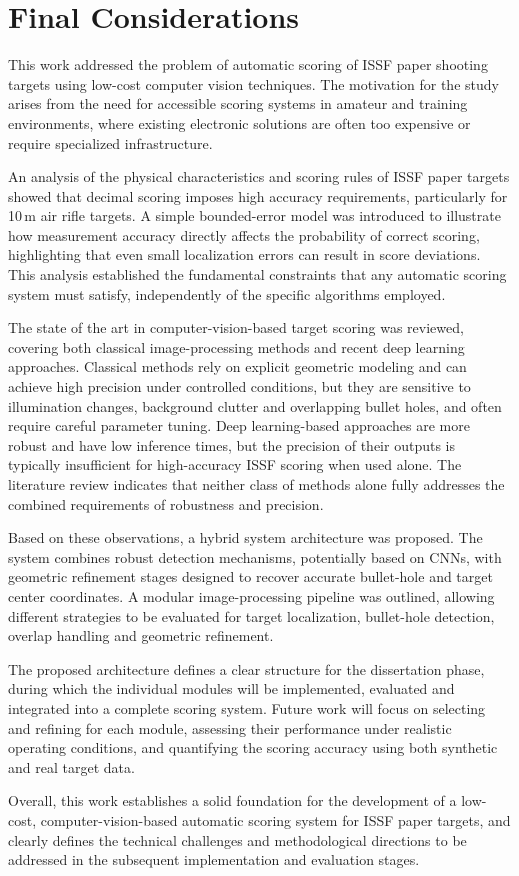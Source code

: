\chapter{Final Considerations}
\label{chap:final_considerations}

This work addressed the problem of automatic scoring of ISSF paper shooting targets
using low-cost computer vision techniques. The motivation for the study arises from the need for
accessible scoring systems in amateur and training environments, where existing electronic
solutions are often too expensive or require specialized infrastructure.

An analysis of the physical characteristics and scoring rules of ISSF paper targets showed that
decimal scoring imposes high accuracy requirements, particularly for 10\,m air rifle
targets. A simple bounded-error model was introduced to illustrate how measurement accuracy
directly affects the probability of correct scoring, highlighting that even small localization
errors can result in score deviations. This analysis established the fundamental constraints that
any automatic scoring system must satisfy, independently of the specific algorithms employed.

The state of the art in computer-vision-based target scoring was reviewed, covering both
classical image-processing methods and recent deep learning approaches. Classical methods
rely on explicit geometric modeling and can achieve high precision under controlled conditions,
but they are sensitive to illumination changes, background clutter and overlapping
bullet holes, and often require careful parameter tuning. Deep learning-based approaches are
more robust and have low inference times, but the precision of their outputs is 
typically insufficient for high-accuracy ISSF
scoring when used alone. The literature review indicates that neither class of methods
alone fully addresses the combined requirements of robustness and precision.

Based on these observations, a hybrid system architecture was proposed. The system combines
robust detection mechanisms, potentially based on CNNs, with
geometric refinement stages designed to recover accurate bullet-hole and target center
coordinates. A modular image-processing pipeline was outlined, allowing different strategies
to be evaluated for target localization, bullet-hole detection, overlap handling and
geometric refinement.

The proposed architecture defines a clear structure for the dissertation phase, during which
the individual modules will be implemented, evaluated and integrated into a complete scoring
system. Future work will focus on selecting and refining for each module,
assessing their performance under realistic operating conditions, and
quantifying the scoring accuracy using both synthetic and real target data.

Overall, this work establishes a solid foundation for the development of a low-cost,
computer-vision-based automatic scoring system for ISSF paper targets, and clearly defines
the technical challenges and methodological directions to be addressed in the subsequent
implementation and evaluation stages.
